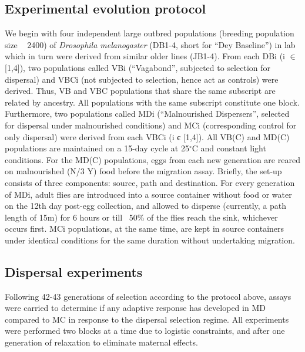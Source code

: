 \documentclass[12pt,onecolumn,twoside]{article}
\begin{document}
	\subsection{Experimental evolution protocol}
	We begin with four independent large outbred populations (breeding population size ~ 2400) of \textit{Drosophila melanogaster} (DB1-4, short for “Dey Baseline”) in lab which in turn were derived from similar older lines (JB1-4). From each DBi (i $\in$ [1,4]), two populations called VBi (“Vagabond”, subjected to selection for dispersal) and VBCi (not subjected to selection, hence act as controls) were derived. Thus, VB and VBC populations that share the same subscript are related by ancestry. All populations with the same subscript constitute one block. Furthermore, two populations called MDi (“Malnourished Dispersers”, selected for dispersal under malnourished conditions) and MCi (corresponding control for only dispersal) were derived from each VBCi (i є [1,4]). All VB(C) and MD(C) populations are maintained on a 15-day cycle at 25$^{\circ}$C and constant light conditions. For the MD(C) populations, eggs from each new generation are reared on malnourished (N/3 Y) food before the migration assay. Briefly, the set-up consists of three components: source, path and destination. For every generation of MDi, adult flies are introduced into a source container without food or water on the 12th day post-egg collection, and allowed to disperse (currently, a path length of 15m) for 6 hours or till ~50\% of the flies reach the sink, whichever occurs first. MCi populations, at the same time, are kept in source containers under identical conditions for the same duration without undertaking migration.
	\subsection{Dispersal experiments}
	Following 42-43 generations of selection according to the protocol above, assays were carried to determine if any adaptive response has developed in MD compared to MC in response to the dispersal selection regime. All experiments were performed two blocks at a time due to logistic constraints, and after one generation of relaxation to eliminate maternal effects.
\end{document}
